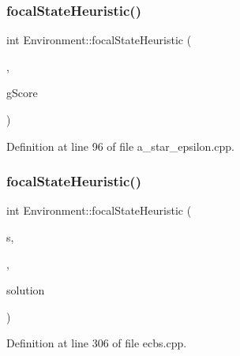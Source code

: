 \subsubsection{\texorpdfstring{focal\+State\+Heuristic()}{focalStateHeuristic()}\hspace{0.1cm}{\footnotesize\ttfamily [1/2]}}
{\footnotesize\ttfamily int Environment\+::focal\+State\+Heuristic (\begin{DoxyParamCaption}\item[{const \hyperlink{struct_state}{State} \&}]{,  }\item[{int}]{g\+Score }\end{DoxyParamCaption})\hspace{0.3cm}{\ttfamily [inline]}}



Definition at line 96 of file a\+\_\+star\+\_\+epsilon.\+cpp.

\mbox{\label{class_environment_ae9c3ec27de36238b2d0ea75b8e2e80b1}} 
\subsubsection{\texorpdfstring{focal\+State\+Heuristic()}{focalStateHeuristic()}\hspace{0.1cm}{\footnotesize\ttfamily [2/2]}}
{\footnotesize\ttfamily int Environment\+::focal\+State\+Heuristic (\begin{DoxyParamCaption}\item[{const \hyperlink{struct_state}{State} \&}]{s,  }\item[{int}]{,  }\item[{const std\+::vector$<$ \hyperlink{structlib_multi_robot_planning_1_1_plan_result}{Plan\+Result}$<$ \hyperlink{struct_state}{State}, \hyperlink{a__star_8cpp_a8bb1ef53467e4f61410d12822d922498}{Action}, int $>$ $>$ \&}]{solution }\end{DoxyParamCaption})\hspace{0.3cm}{\ttfamily [inline]}}



Definition at line 306 of file ecbs.\+cpp.

